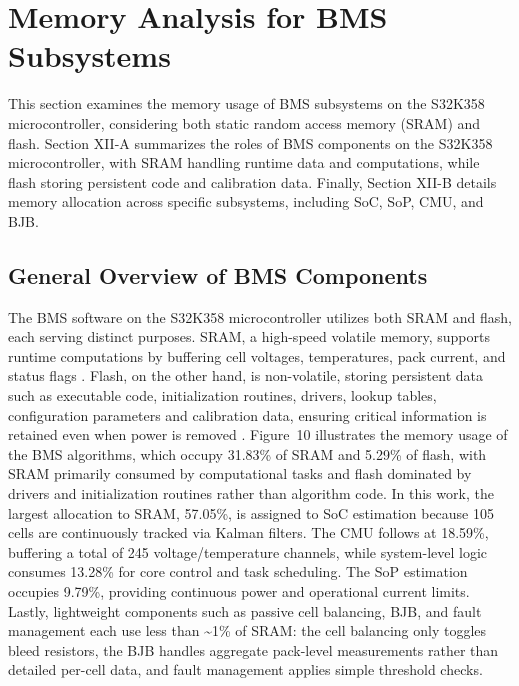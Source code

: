 \section{Memory Analysis for BMS Subsystems}
This section examines the memory usage of BMS subsystems on the S32K358 microcontroller, considering both static random access memory (SRAM) and flash. Section XII-A summarizes the roles of BMS components on the S32K358 microcontroller, with SRAM handling runtime data and computations, while flash storing persistent code and calibration data. Finally, Section XII-B details memory allocation across specific subsystems, including SoC, SoP, CMU, and BJB.

\subsection{General Overview of BMS Components}
The BMS software on the S32K358 microcontroller utilizes both SRAM and flash, each serving distinct purposes. SRAM, a high-speed volatile memory, supports runtime computations by buffering cell voltages, temperatures, pack current, and status flags \cite{memoryDefinitions}. Flash, on the other hand, is non-volatile, storing persistent data such as executable code, initialization routines, drivers, lookup tables, configuration parameters and calibration data, ensuring critical information is retained even when power is removed \cite{memoryDefinitions}. Figure~10 illustrates the memory usage of the BMS algorithms, which occupy 31.83\% of SRAM and 5.29\% of flash, with SRAM primarily consumed by computational tasks and flash dominated by drivers and initialization routines rather than algorithm code.
In this work, the largest allocation to SRAM, 57.05\%, is assigned to SoC estimation because 105 cells are continuously tracked via Kalman filters. The CMU follows at 18.59\%, buffering a total of 245 voltage/temperature channels, while system-level logic consumes 13.28\% for core control and task scheduling. The SoP estimation occupies 9.79\%, providing continuous power and operational current limits. Lastly, lightweight components such as passive cell balancing, BJB, and fault management each use less than \textasciitilde{1\%} of SRAM: the cell balancing only toggles bleed resistors, the BJB handles aggregate pack-level measurements rather than detailed per-cell data, and fault management applies simple threshold checks.

